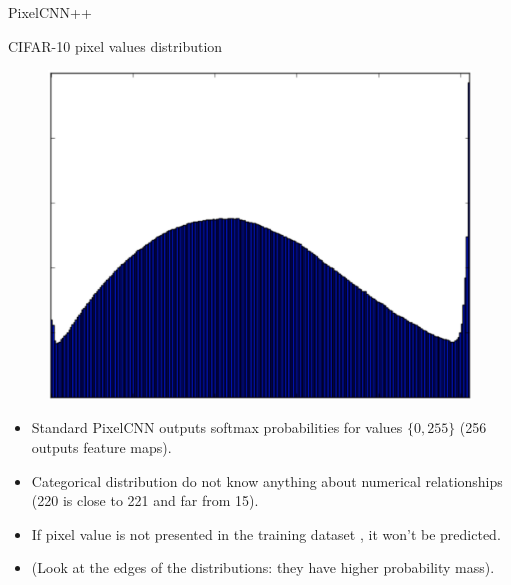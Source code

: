 \begin{frame}{PixelCNN++}
	\begin{block}{CIFAR-10 pixel values distribution}
		\begin{figure}
			\includegraphics[width=0.3\linewidth]{figs/pixelcnn++_pixels_distr}
		\end{figure}
	\end{block}
	\vspace{-0.5cm}
	\begin{itemize}
		\item Standard PixelCNN outputs softmax probabilities for values $\{0, 255\}$ (256 outputs feature maps). 
		\item Categorical distribution do not know anything about numerical relationships (220 is close to 221 and far from 15).
		\item If pixel value is not presented in the training dataset , it won't be predicted.
		\item (Look at the edges of the distributions: they have higher probability mass).
	\end{itemize}
\end{frame}
